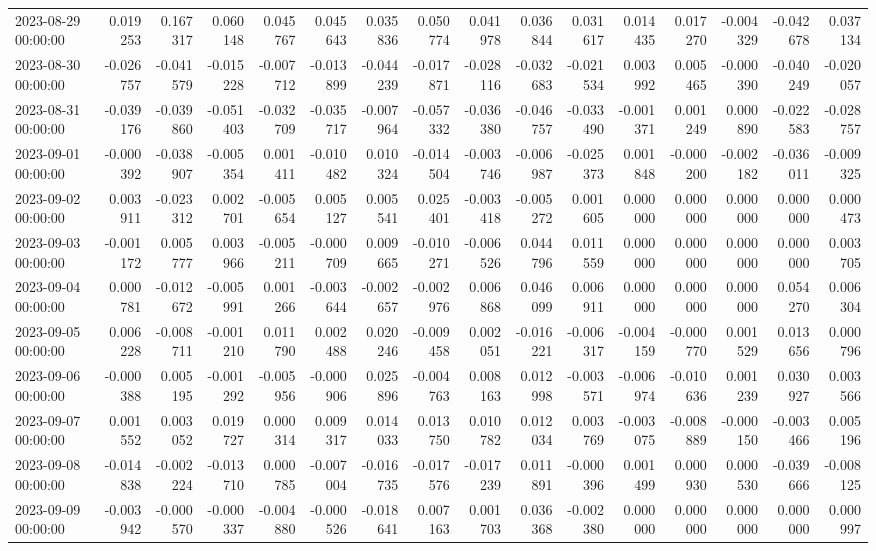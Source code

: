 \begin{tabular}{lrrrrrrrrrrrrrrr}
2023-08-29 00:00:00 & 0.019253 & 0.167317 & 0.060148 & 0.045767 & 0.045643 & 0.035836 & 0.050774 & 0.041978 & 0.036844 & 0.031617 & 0.014435 & 0.017270 & -0.004329 & -0.042678 & 0.037134 \\
2023-08-30 00:00:00 & -0.026757 & -0.041579 & -0.015228 & -0.007712 & -0.013899 & -0.044239 & -0.017871 & -0.028116 & -0.032683 & -0.021534 & 0.003992 & 0.005465 & -0.000390 & -0.040249 & -0.020057 \\
2023-08-31 00:00:00 & -0.039176 & -0.039860 & -0.051403 & -0.032709 & -0.035717 & -0.007964 & -0.057332 & -0.036380 & -0.046757 & -0.033490 & -0.001371 & 0.001249 & 0.000890 & -0.022583 & -0.028757 \\
2023-09-01 00:00:00 & -0.000392 & -0.038907 & -0.005354 & 0.001411 & -0.010482 & 0.010324 & -0.014504 & -0.003746 & -0.006987 & -0.025373 & 0.001848 & -0.000200 & -0.002182 & -0.036011 & -0.009325 \\
2023-09-02 00:00:00 & 0.003911 & -0.023312 & 0.002701 & -0.005654 & 0.005127 & 0.005541 & 0.025401 & -0.003418 & -0.005272 & 0.001605 & 0.000000 & 0.000000 & 0.000000 & 0.000000 & 0.000473 \\
2023-09-03 00:00:00 & -0.001172 & 0.005777 & 0.003966 & -0.005211 & -0.000709 & 0.009665 & -0.010271 & -0.006526 & 0.044796 & 0.011559 & 0.000000 & 0.000000 & 0.000000 & 0.000000 & 0.003705 \\
2023-09-04 00:00:00 & 0.000781 & -0.012672 & -0.005991 & 0.001266 & -0.003644 & -0.002657 & -0.002976 & 0.006868 & 0.046099 & 0.006911 & 0.000000 & 0.000000 & 0.000000 & 0.054270 & 0.006304 \\
2023-09-05 00:00:00 & 0.006228 & -0.008711 & -0.001210 & 0.011790 & 0.002488 & 0.020246 & -0.009458 & 0.002051 & -0.016221 & -0.006317 & -0.004159 & -0.000770 & 0.001529 & 0.013656 & 0.000796 \\
2023-09-06 00:00:00 & -0.000388 & 0.005195 & -0.001292 & -0.005956 & -0.000906 & 0.025896 & -0.004763 & 0.008163 & 0.012998 & -0.003571 & -0.006974 & -0.010636 & 0.001239 & 0.030927 & 0.003566 \\
2023-09-07 00:00:00 & 0.001552 & 0.003052 & 0.019727 & 0.000314 & 0.009317 & 0.014033 & 0.013750 & 0.010782 & 0.012034 & 0.003769 & -0.003075 & -0.008889 & -0.000150 & -0.003466 & 0.005196 \\
2023-09-08 00:00:00 & -0.014838 & -0.002224 & -0.013710 & 0.000785 & -0.007004 & -0.016735 & -0.017576 & -0.017239 & 0.011891 & -0.000396 & 0.001499 & 0.000930 & 0.000530 & -0.039666 & -0.008125 \\
2023-09-09 00:00:00 & -0.003942 & -0.000570 & -0.000337 & -0.004880 & -0.000526 & -0.018641 & 0.007163 & 0.001703 & 0.036368 & -0.002380 & 0.000000 & 0.000000 & 0.000000 & 0.000000 & 0.000997 \\

\end{tabular}

